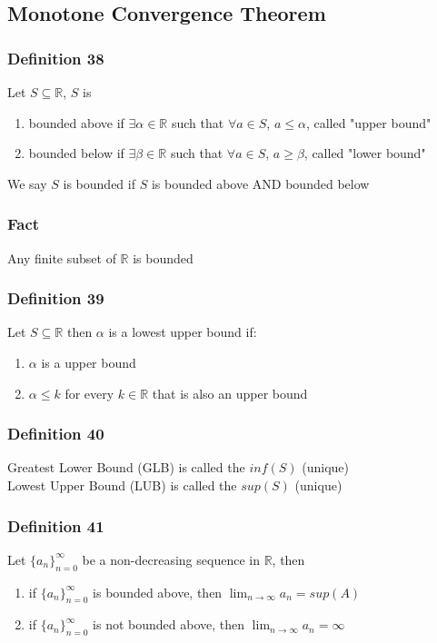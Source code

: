 \documentclass[12pt, letterpaper]{article}
\begin{document}
\subsection{Monotone Convergence Theorem}
\subsubsection*{Definition 38}
Let $S \subseteq \mathbb{R}$, $S$ is 
\begin{enumerate}
    \item bounded above if $\exists\alpha\in\mathbb{R}$ such that $\forall a \in S$, $a \leq \alpha$, called "upper bound"
    \item bounded below if $\exists\beta\in\mathbb{R}$ such that $\forall a \in S$, $a \geq \beta$, called "lower bound"
\end{enumerate}
We say $S$ is bounded if $S$ is bounded above AND bounded below
\subsubsection*{Fact}
Any finite subset of $\mathbb{R}$ is bounded 
\subsubsection*{Definition 39}
Let $S \subseteq \mathbb{R}$ then $\alpha$ is a lowest upper bound if: 
\begin{enumerate}
    \item $\alpha$ is a upper bound
    \item $\alpha \leq k$ for every $k \in \mathbb{R}$ that is also an upper bound 
\end{enumerate}
\subsubsection*{Definition 40}
Greatest Lower Bound (GLB) is called the $inf(S)$ (unique) \\
Lowest Upper Bound (LUB) is called the $sup(S)$ (unique)
\subsubsection*{Definition 41}
Let $\{a_n\}^\infty_{n=0}$ be a non-decreasing sequence in $\mathbb{R}$, then 
\begin{enumerate}
    \item if $\{a_n\}^\infty_{n=0}$ is bounded above, then $\displaystyle\lim_{n\to\infty} a_n = sup(A)$
    \item if $\{a_n\}^\infty_{n=0}$ is not bounded above, then $\displaystyle\lim_{n\to\infty} a_n = \infty$
\end{enumerate}
\end{document}
